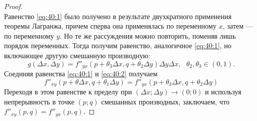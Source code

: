 \documentclass[12pt]{report}
\numberwithin{equation}{section}
\begin{document}
\begin{proof}
\begin{equation}
\end{equation}
Равенство \eqref{eq:40:1} было получено в результате двухкратного применения теоремы Лагранжа, причем сперва она применялась по переменному $x$, затем --- по переменному $y$. Но те же рассуждения можно повторить, поменяв лишь порядок переменных. Тогда получим равенство, аналогичное \eqref{eq:40:1}, но включающее другую смешанную производную:
\begin{equation} \label{eq:40:2}
g(\Delta x, \Delta y) = f''_{yx} (p + \theta_3 \Delta x, q  +\theta_2 \Delta y) \Delta y \Delta x,~~~ \theta_2, \theta_3 \in (0,1).
\end{equation}
Соединяя равенства \eqref{eq:40:1} и \eqref{eq:40:2} получаем
\[  f''_{xy} (p + \theta \Delta x, q  +\theta_1 \Delta y) = f''_{yx} (p + \theta_3 \Delta x, q  +\theta_2 \Delta y)\]
Переходя в этом равенстве к пределу при $(\Delta x; \Delta y) \to (0; 0)$ и используя непрерывность в точке $(p;q)$ смешанных производных, заключаем, что $f''_{xy}(p,q) = f''_{yx}(p,q)$.
\end{proof}
\end{document}
